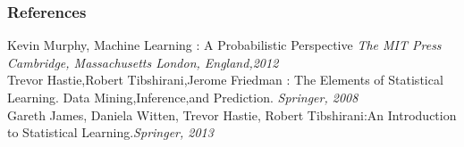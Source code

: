 \documentclass{article} %
\begin{document}
\subsubsection*{References}
Kevin Murphy, Machine Learning : A Probabilistic Perspective {\em The MIT Press
Cambridge, Massachusetts
London, England,2012}\\
Trevor Hastie,Robert Tibshirani,Jerome Friedman : The Elements of
Statistical Learning. Data Mining,Inference,and Prediction. {\em Springer, 2008}\\
Gareth James,
Daniela Witten,
Trevor Hastie,
Robert Tibshirani:An Introduction to Statistical Learning.{\em Springer, 2013}
\end{document}
